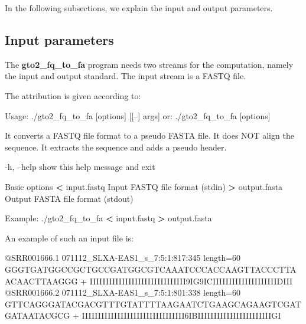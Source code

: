 \documentclass[11pt,]{krantz}
\newenvironment{Shaded}{\begin{snugshade}}{\end{snugshade}}
\newcommand{\OperatorTok}[1]{\textcolor[rgb]{0.43,0.43,0.43}{\textbf{#1}}}
\newcommand{\ExtensionTok}[1]{#1}
\newcommand{\NormalTok}[1]{#1}
\begin{document}
In the following subsections, we explain the input and output
parameters.

\subsection*{Input parameters}\label{input-parameters}


The \textbf{gto2\_fq\_to\_fa} program needs two streams for the
computation, namely the input and output standard. The input stream is a
FASTQ file.

The attribution is given according to:

\begin{Shaded}
\begin{Highlighting}[]
\ExtensionTok{Usage}\NormalTok{: ./gto2_fq_to_fa [options] [[--] args]}
   \ExtensionTok{or}\NormalTok{: ./gto2_fq_to_fa [options]}

\ExtensionTok{It}\NormalTok{ converts a FASTQ file format to a pseudo FASTA file.}
\ExtensionTok{It}\NormalTok{ does NOT align the sequence.}
\ExtensionTok{It}\NormalTok{ extracts the sequence and adds a pseudo header.}

    \ExtensionTok{-h}\NormalTok{, --help            show this help message and exit}

\ExtensionTok{Basic}\NormalTok{ options}
    \OperatorTok{<} \ExtensionTok{input.fastq}\NormalTok{         Input FASTQ file format (stdin)}
    \OperatorTok{>} \ExtensionTok{output.fasta}\NormalTok{        Output FASTA file format (stdout)}

\ExtensionTok{Example}\NormalTok{: ./gto2_fq_to_fa }\OperatorTok{<}\NormalTok{ input.fastq }\OperatorTok{>}\NormalTok{ output.fasta}
\end{Highlighting}
\end{Shaded}

An example of such an input file is:

\begin{Shaded}
\begin{Highlighting}[]
\ExtensionTok{@SRR001666.1}\NormalTok{ 071112_SLXA-EAS1_s_7:5:1:817:345 length=60}
\ExtensionTok{GGGTGATGGCCGCTGCCGATGGCGTCAAATCCCACCAAGTTACCCTTAACAACTTAAGGG}
\ExtensionTok{+}
\ExtensionTok{IIIIIIIIIIIIIIIIIIIIIIIIIIIIII9IG9ICIIIIIIIIIIIIIIIIIIIIDIII}
\ExtensionTok{@SRR001666.2}\NormalTok{ 071112_SLXA-EAS1_s_7:5:1:801:338 length=60}
\ExtensionTok{GTTCAGGGATACGACGTTTGTATTTTAAGAATCTGAAGCAGAAGTCGATGATAATACGCG}
\ExtensionTok{+}
\ExtensionTok{IIIIIIIIIIIIIIIIIIIIIIIIIIIIIIII6IBIIIIIIIIIIIIIIIIIIIIIIIGI}
\end{Highlighting}
\end{Shaded}
\end{document}
